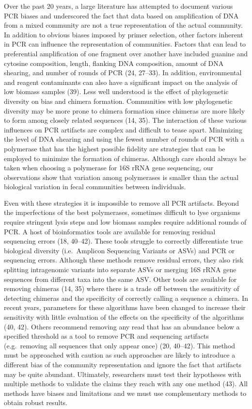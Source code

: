 \documentclass[11pt,]{article}
\begin{document}
Over the past 20 years, a large literature has attempted to document
various PCR biases and underscored the fact that data based on
amplification of DNA from a mixed community are not a true
representation of the actual community. In addition to obvious biases
imposed by primer selection, other factors inherent in PCR can influence
the representation of communities. Factors that can lead to preferential
amplification of one fragment over another have included guanine and
cytosine composition, length, flanking DNA composition, amount of DNA
shearing, and number of rounds of PCR (24, 27--33). In addition,
environmental and reagent contaminants can also have a significant
impact on the analysis of low biomass samples (39). Less well understood
is the effect of phylogenetic diversity on bias and chimera formation.
Communities with low phylogenetic diversity may be more prone to chimera
formation since chimeras are more likely to form among closely related
sequences (14, 35). The interaction of these various influences on PCR
artifacts are complex and difficult to tease apart. Minimizing the level
of DNA shearing and using the fewest number of rounds of PCR with a
polymerase that has the highest possible fidelity are strategies that
can be employed to minimize the formation of chimeras. Although care
should always be taken when choosing a polymerase for 16S rRNA gene
sequencing, our observations show that variation among polymerases is
smaller than the actual biological variation in fecal communities
between individuals.

Even with these strategies it is impossible to remove all PCR artifacts.
Beyond the imperfections of the best polymerases, sometimes difficult to
lyse organisms require stringent lysis steps and low biomass samples
require additional rounds of PCR. A host of bioinformatics tools are
available for removing residual sequencing errors (18, 40--42). These
tools struggle to correctly differentiate true biological diversity
(i.e.~Amplicon Sequencing Variants or ASVs) and PCR or sequencing
errors. Although these methods remove residual errors, they also risk
splitting intragenomic variants into separate ASVs or merging 16S rRNA
gene sequences from different taxa into the same ASV. Other tools are
available for removing chimeras (14, 35) where there is a trade off
between the sensitivity of detecting chimeras and the specificity of
correctly calling a sequence a chimera. In recent years, parameters for
these algorithms have been changed to increase their sensitivity with
little evaluation of the effects on the specificity of the algorithms
(40, 42). Others recommend removing any read that has an abundance below
a specified threshold as a tool to remove PCR and sequencing artifacts
(e.g.~removing all sequences that only appear once) (20, 40--42). This
method must be approached with caution as such approaches are likely to
introduce a different bias of the community representation and ignore
the fact that artifacts may be quite abundant. Ultimately, researchers
must test their hypotheses with multiple methods to validate the claims
they reach with any one method (43). All methods have biases and
limitations and we must use complementary methods to obtain robust
results.
\end{document}
